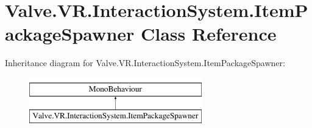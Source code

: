 \hypertarget{class_valve_1_1_v_r_1_1_interaction_system_1_1_item_package_spawner}{}\section{Valve.\+V\+R.\+Interaction\+System.\+Item\+Package\+Spawner Class Reference}
\label{class_valve_1_1_v_r_1_1_interaction_system_1_1_item_package_spawner}
Inheritance diagram for Valve.\+V\+R.\+Interaction\+System.\+Item\+Package\+Spawner\+:\begin{figure}[H]
\begin{center}
\leavevmode
\includegraphics[height=2.000000cm]{class_valve_1_1_v_r_1_1_interaction_system_1_1_item_package_spawner}
\end{center}
\end{figure}
